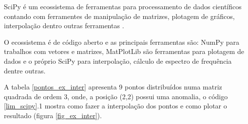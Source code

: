             SciPy é um ecossistema de ferramentas para processamento de dados científicos contando com ferramentes de manipulação de matrizes, plotagem de gráficos, interpolação dentro outras ferramentas \cite{scipy}.
            
            O ecossistema é de código aberto e as principais ferramentas são: NumPy para trabalhos com vetores e matrizes, MatPlotLib são ferramentas para plotagem de dados e o próprio SciPy para interpolação, cálculo de espectro de frequência dentre outras.
            
            A tabela \ref{pontos_ex_inter} apresenta 9 pontos distribuídos numa matriz quadrada de ordem 3, onde, a posição (2,2) possui uma anomalia, o código \ref{lim_scipy}.1 mostra como fazer a interpolação dos pontos e como plotar o resultado (figura \ref{fig_ex_inter}).
            
            \begin{table}[H]
                \centering
                \caption{Distribuição de pontos com valor anômalo ao centro.}
                \label{pontos_ex_inter}
            \end{table}
            

